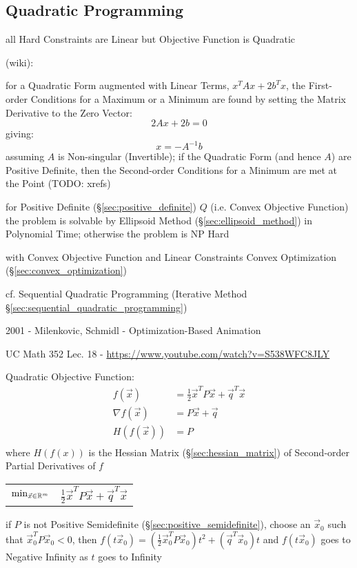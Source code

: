 \subsection{Quadratic Programming}\label{sec:quadratic_programming}

all Hard Constraints are Linear but Objective Function is Quadratic

(wiki):

for a Quadratic Form augmented with Linear Terms, $x^TAx + 2b^Tx$, the
First-order Conditions for a Maximum or a Minimum are found by setting the
Matrix Derivative to the Zero Vector:
\[
  2Ax + 2b = 0
\]
giving:
\[
  x = -A^{-1}b
\]
assuming $A$ is Non-singular (Invertible); if the Quadratic Form (and hence
$A$) are Positive Definite, then the Second-order Conditions for a
Minimum are met at the Point
(TODO: xrefs)

for Positive Definite (\S\ref{sec:positive_definite}) $Q$ (i.e. Convex
Objective Function) the problem is solvable by Ellipsoid Method
(\S\ref{sec:ellipsoid_method}) in Polynomial Time; otherwise the problem is NP
Hard

with Convex Objective Function and Linear Constraints \fist Convex Optimization
(\S\ref{sec:convex_optimization})

\fist cf. Sequential Quadratic Programming (Iterative Method
\S\ref{sec:sequential_quadratic_programming})

2001 - Milenkovic, Schmidl - Optimization-Based Animation

UC Math 352 Lec. 18 - \url{https://www.youtube.com/watch?v=S538WFC8JLY}

Quadratic Objective Function:
\begin{align*}
  f(\vec{x})        & = \frac{1}{2}\vec{x}^T P \vec{x} + \vec{q}^T\vec{x} \\
  \nabla f(\vec{x}) & = P\vec{x} + \vec{q} \\
  H(f(\vec{x}))     & = P \\
\end{align*}
where $H(f(x))$ is the Hessian Matrix (\S\ref{sec:hessian_matrix}) of
Second-order Partial Derivatives of $f$

\begin{tabular}{r l}
  $\mathrm{min}_{\vec{x} \in \mathbb{R}^m}$ &
    $\frac{1}{2}\vec{x}^T P\vec{x} + \vec{q}^T\vec{x}$ \\
\end{tabular}

if $P$ is not Positive Semidefinite (\S\ref{sec:positive_semidefinite}), choose
an $\vec{x}_0$ such that $\vec{x}_0^T P\vec{x}_0 < 0$, then
$f(t\vec{x}_0) = (\frac{1}{2}\vec{x}_0^TP\vec{x}_0)t^2 + (\vec{q}^T\vec{x}_0)t$
and $f(t\vec{x}_0)$ goes to Negative Infinity as $t$ goes to Infinity


